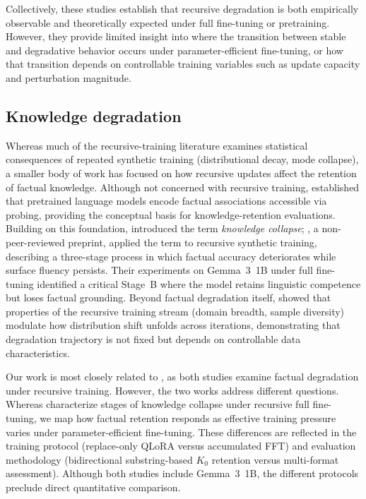 \documentclass[a4paper,fleqn]{cas-dc}
\newif\ifshowchanges
\newcommand{\rev}[1]{\ifshowchanges{\color{blue}#1}\else{#1}\fi}
\begin{document}
Collectively, these studies establish that recursive degradation is both
empirically observable and theoretically expected under full fine-tuning or
pretraining. However, they provide limited insight into where the transition
between stable and degradative behavior occurs under parameter-efficient
fine-tuning, or how that transition depends on controllable training variables
such as update capacity and perturbation magnitude.

\subsection{Knowledge degradation}

Whereas much of the recursive-training literature examines statistical
consequences of repeated synthetic training (distributional decay, mode
collapse), a smaller body of work has focused on how recursive updates affect
the retention of factual knowledge. Although not concerned with recursive
training, \citet{petroni2019} established that pretrained language models encode
factual associations accessible via probing, providing the conceptual basis for
knowledge-retention evaluations. Building on this foundation,
\rev{\citet{peterson2024} introduced the term \textit{knowledge collapse}; \citet{keisha2025}, a non-peer-reviewed preprint, applied the term to recursive synthetic training, describing a}
three-stage process in which factual accuracy deteriorates while surface fluency
persists. Their experiments on Gemma~3~1B under full fine-tuning identified a
critical Stage~B where the model retains linguistic competence but loses factual
grounding. Beyond factual degradation itself, \citet{kovac2025recursive}
showed that properties of the recursive training stream (domain breadth, sample
diversity) modulate how distribution shift unfolds across iterations,
demonstrating that degradation trajectory is not fixed but depends on
controllable data characteristics.

Our work is most closely related to \citet{keisha2025}, as both studies examine
factual degradation under recursive training. However, the two works address
different questions. Whereas \citet{keisha2025} characterize stages of knowledge
collapse under recursive full fine-tuning, we map how factual retention responds
as effective training pressure varies under parameter-efficient fine-tuning.
These differences are reflected in the training protocol (replace-only QLoRA
versus accumulated FFT) and evaluation methodology (\rev{bidirectional substring-based $K_0$ retention}
versus multi-format assessment). Although both studies include Gemma~3~1B, the
different protocols preclude direct quantitative comparison.
\end{document}
